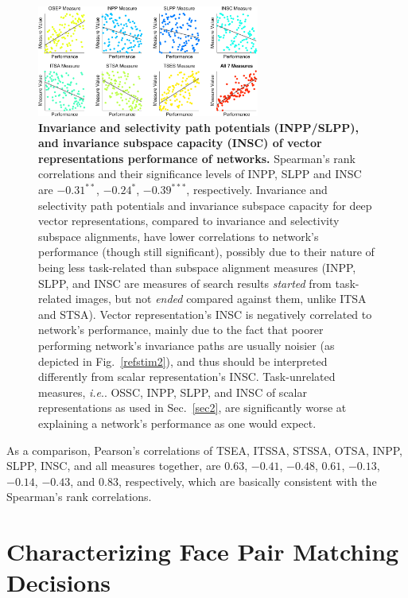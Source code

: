 \documentclass{article} %
\makeatletter
\DeclareRobustCommand\onedot{\futurelet\@let@token\@onedot}
\def\@onedot{\ifx\@let@token.\else.\null\fi\xspace}
\def\ie{\emph{i.e}\onedot} \def\Ie{\emph{I.e}\onedot}
\makeatother
\begin{document}
\begin{figure}[H]
\centering \includegraphics[width=0.65\textwidth, trim=25ex 27ex 0 0, clip]{Figs_supp/e_fig7_scatter.pdf}
\caption{ 
{\bf Invariance and selectivity path potentials (INPP/SLPP), and invariance subspace capacity (INSC) of vector representations \vs performance of networks.} Spearman's rank correlations and their significance levels of INPP, SLPP and INSC are $-0.31^{\ast\ast}$, $-0.24^{\ast}$, $-0.39^{\ast\ast\ast}$, respectively.
Invariance and selectivity path potentials and invariance subspace capacity for deep vector representations, compared to invariance and selectivity subspace alignments, have lower correlations to network's performance (though still significant), possibly due to their nature of being less task-related than subspace alignment measures (INPP, SLPP, and INSC are measures of search results \emph{started} from task-related images, but not \emph{ended} compared against them, unlike ITSA and STSA).
Vector representation's INSC is negatively correlated to network's performance, mainly due to the fact that poorer performing network's invariance paths are usually noisier (as depicted in Fig.~\ref{refstim2}), and thus should be interpreted differently from scalar representation's INSC.
Task-unrelated measures, \ie OSSC, INPP, SLPP, and INSC of scalar representations as used in Sec.~\ref{sec2}, are significantly worse at explaining a network's performance as one would expect.
}
\end{figure}

As a comparison, Pearson's correlations of TSEA, ITSSA, STSSA, OTSA, INPP, SLPP, INSC, and all measures together, are $0.63$, $-0.41$, $-0.48$, $0.61$, $-0.13$, $-0.14$, $-0.43$, and $0.83$, respectively, which are basically consistent with the Spearman's rank correlations.


\section{Characterizing Face Pair Matching Decisions}
\end{document}
